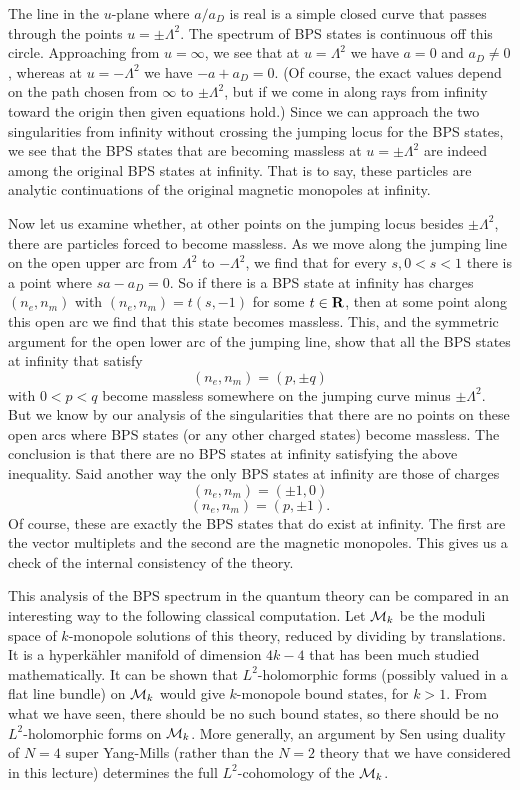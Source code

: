 \documentclass[10pt]{article}
\begin{document}
The line in the $u$-plane where $a/a_D$ is real is a simple closed
curve that passes through the points $u=\pm\Lambda^2$. 
The spectrum of BPS states is continuous off this circle.
Approaching from $u=\infty$, we see that 
 at $u=\Lambda^2$ we have $a=0$ and $a_D\not= 0$, whereas at
$u=-\Lambda^2$ we have $-a+a_D=0$. (Of course, the exact values depend
on the path chosen from $\infty$ to $\pm\Lambda^2$, but if we come in
along rays from infinity toward the origin then given equations hold.)
Since we can approach the two singularities from infinity without
crossing the jumping locus for the BPS states, we see that the BPS
states that are becoming massless at $u=\pm\Lambda^2$ are indeed among
the original BPS states at infinity.  That is to say, these particles
are analytic continuations of the original magnetic monopoles at
infinity. 

Now let us examine whether, at other points on the jumping locus
besides $\pm\Lambda^2$, there are particles forced to become
massless. As we move along the jumping line on the open upper arc from
$\Lambda^2$ to 
$-\Lambda^2$, we find that for
every $s, 0 < s <1$ there is a point where
$sa-a_D=0$.
So if  there is a BPS state at infinity has charges $(n_e,n_m)$ with 
$(n_e,n_m)=t(s,-1)$ for some $t\in {\bf R}$, then at some point along
this open arc we find that this state becomes massless.
This, and the symmetric argument for
the open lower arc of the jumping line, show that all the BPS states
at infinity that satisfy 
$$(n_e,n_m)=(p,\pm q)$$
with $0<p<q$ become massless somewhere on the jumping curve  minus
$\pm\Lambda^2$. 
But  we know by our analysis of the singularities that there
are no points on these open arcs where BPS states (or any other
charged states) become massless.  The conclusion is that there are no
BPS states at infinity satisfying the above inequality. Said another
way the only BPS states at infinity are those of charges
$$(n_e,n_m)=(\pm 1,0)$$
$$(n_e,n_m)=(p,\pm 1).$$
Of course, these are exactly the BPS states that do exist at infinity.
The first are the vector multiplets and the second are the magnetic
monopoles. 
This gives us a check of the internal consistency of the theory.

This analysis of the BPS  spectrum in the quantum theory can be
compared in an interesting way to the following classical 
computation.  Let ${\cal M}_k$ be the moduli space of $k$-monopole
solutions of this theory, reduced by dividing by translations.  It is
a hyperk\"ahler manifold of dimension $4k-4$ that has been much
studied mathematically.  It can be shown that $L^2$-holomorphic forms
(possibly valued in a flat line bundle) on ${\cal M}_k$ would give
$k$-monopole bound states, for $k>1$.  From what we have seen, there
should be no such bound states, so there should be no $L^2$-holomorphic
forms on ${\cal M}_k$.  More generally, an argument by Sen using
duality of $N=4$ super Yang-Mills (rather than the $N=2$ theory that
we have considered in this lecture) determines the full
$L^2$-cohomology of the ${\cal M}_k$.
\end{document}
